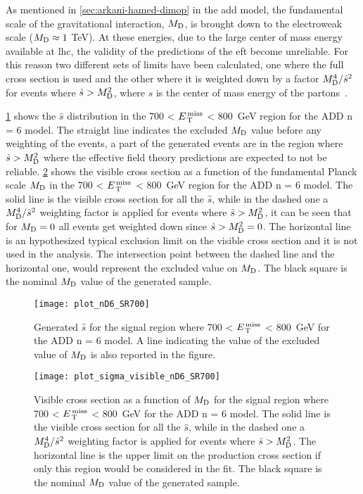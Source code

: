 As mentioned in \cref{sec:arkani-hamed-dimop} in the \gls{add} model, the
fundamental scale of the gravitational interaction, $M_\mathrm{D}$, is brought down to
the electroweak scale ($M_\mathrm{D} \approx 1~$TeV). At these energies, due to the large
center of mass energy available at \gls{lhc}, the validity of the predictions of
the \gls{eft} become unreliable. For this reason two different sets of limits
have been calculated, one where the full cross section is used and the other
where it is weighted down by a factor $M_\mathrm{D}^4/\hat{s}^2$ for events where
$\hat{s} > M_\mathrm{D}^2$, where $\hat{s}$ is the center of mass energy of the
partons~\cite{LEDWeightFactor}.


\cref{fig:shat} shows the $\hat{s}$ distribution in the 700 < $E_\mathrm{\, T}^\mathrm{\, miss}$ < 800~GeV
region for the ADD n = 6 model. The straight line indicates the excluded $M_\mathrm{D}$
value before any weighting of the events, a part of the generated events are in
the region where $\hat{s} > M_\mathrm{D}^2$ where the effective field theory predictions
are expected to not be reliable. \cref{fig:vis_sigma_trunc} shows the visible
cross section as a function of the fundamental Planck scale $M_\mathrm{D}$ in the 700 <
$E_\mathrm{\, T}^\mathrm{\, miss}$ < 800~GeV region for the ADD n = 6 model. The solid line is the visible
cross section for all the $\hat{s}$, while in the dashed one a $M_\mathrm{D}^4/\hat{s}^2$
weighting factor is applied for events where $\hat{s} > M_\mathrm{D}^2$, it can be seen
that for $M_\mathrm{D} = 0$ all events get weighted down since $\hat{s} > M_\mathrm{D}^2 = 0$. The
horizontal line is an hypothesized typical exclusion limit on the visible cross
section and it is not used in the analysis. The intersection point between the
dashed line and the horizontal one, would represent the excluded value on
$M_\mathrm{D}$. The black square is the nominal $M_\mathrm{D}$ value of the generated sample.

\begin{figure}[!h]
  \centering
  \texttt{[image: plot\_nD6\_SR700]}
  \caption{Generated $\hat{s}$ for the signal region where 700 < $E_\mathrm{\, T}^\mathrm{\, miss}$ <
    800~GeV for the ADD n = 6 model. A line indicating the value of the excluded
    value of $M_\mathrm{D}$ is also reported in the figure.}
  \label{fig:shat}
\end{figure}

\begin{figure}[!h]
  \texttt{[image: plot\_sigma\_visible\_nD6\_SR700]}
  \caption{Visible cross section as a function of $M_\mathrm{D}$ for the signal region
    where 700 < $E_\mathrm{\, T}^\mathrm{\, miss}$ < 800~GeV for the ADD n = 6 model. The solid line is the
    visible cross section for all the $\hat{s}$, while in the dashed one a
    $M_\mathrm{D}^4/\hat{s}^2$ weighting factor is applied for events where
    $\hat{s} > M_\mathrm{D}^2$. The horizontal line is the upper limit on the production
    cross section if only this region would be considered in the fit. The black
    square is the nominal $M_\mathrm{D}$ value of the generated sample.}
  \label{fig:vis_sigma_trunc}
\end{figure}
